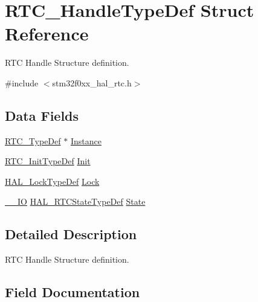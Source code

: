 \hypertarget{struct_r_t_c___handle_type_def}{}\section{R\+T\+C\+\_\+\+Handle\+Type\+Def Struct Reference}
\label{struct_r_t_c___handle_type_def}


R\+TC Handle Structure definition.  




{\ttfamily \#include $<$stm32f0xx\+\_\+hal\+\_\+rtc.\+h$>$}

\subsection*{Data Fields}
\begin{DoxyCompactItemize}
\item 
\hyperlink{struct_r_t_c___type_def}{R\+T\+C\+\_\+\+Type\+Def} $\ast$ \hyperlink{struct_r_t_c___handle_type_def_acfce044f819f685610d976ca4f57054c}{Instance}
\item 
\hyperlink{struct_r_t_c___init_type_def}{R\+T\+C\+\_\+\+Init\+Type\+Def} \hyperlink{struct_r_t_c___handle_type_def_aac564b993793d2de100bf1113472548d}{Init}
\item 
\hyperlink{stm32f0xx__hal__def_8h_ab367482e943333a1299294eadaad284b}{H\+A\+L\+\_\+\+Lock\+Type\+Def} \hyperlink{struct_r_t_c___handle_type_def_ad4cf225029dbefe8d3fe660c33b8bb6b}{Lock}
\item 
\hyperlink{core__sc300_8h_aec43007d9998a0a0e01faede4133d6be}{\+\_\+\+\_\+\+IO} \hyperlink{group___r_t_c___exported___types_ga1e2460a2d13c4efc7a2a1ab2a1ebd32b}{H\+A\+L\+\_\+\+R\+T\+C\+State\+Type\+Def} \hyperlink{struct_r_t_c___handle_type_def_a5ac1164f6e004d661885edbd813c24b0}{State}
\end{DoxyCompactItemize}


\subsection{Detailed Description}
R\+TC Handle Structure definition. 

\subsection{Field Documentation}
\mbox{\label{struct_r_t_c___handle_type_def_aac564b993793d2de100bf1113472548d}} 
